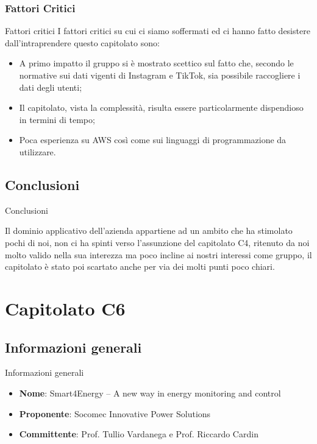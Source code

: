 \documentclass[11pt]{article}
\begin{document}
    \subsubsection{Fattori Critici} Fattori critici
    I fattori critici su cui ci siamo soffermati ed ci hanno fatto desistere dall'intraprendere questo capitolato sono:
    \begin{itemize}
            \item A primo impatto il gruppo si è mostrato scettico sul fatto che, secondo le normative sui dati vigenti di Instagram e TikTok, sia possibile raccogliere i dati degli utenti;
			\item Il capitolato, vista la complessità, risulta essere particolarmente dispendioso in termini di tempo;
			\item Poca esperienza su AWS così come sui linguaggi di programmazione da utilizzare.
        \end{itemize}
    \subsection{Conclusioni} Conclusioni
    
    Il dominio applicativo dell'azienda appartiene ad un ambito che ha stimolato pochi di noi, non ci ha spinti verso l'assunzione del capitolato C4, ritenuto da noi molto valido nella sua interezza ma poco incline ai nostri interessi come gruppo, il capitolato è stato poi scartato anche per via dei molti punti poco chiari.

\newpage








\section{Capitolato C6}
    \subsection{Informazioni generali} Informazioni generali
    \begin{itemize}
        \item \textbf{Nome}: Smart4Energy – A new way in energy monitoring and control
        \item \textbf{Proponente}: Socomec Innovative Power Solutions
        \item \textbf{Committente}: Prof. Tullio Vardanega e Prof. Riccardo Cardin
    \end{itemize}
\end{document}
